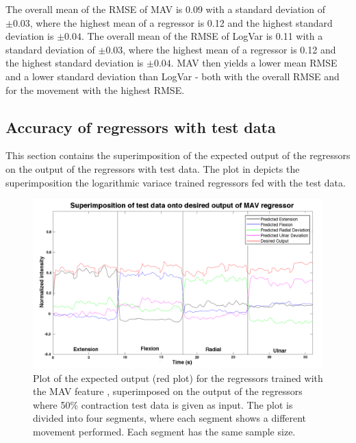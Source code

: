 The overall mean of the RMSE of MAV is 0.09 with a standard deviation of $\pm 0.03$, where the highest mean of a regressor is 0.12 and the highest standard deviation is $\pm 0.04$. The overall mean of the RMSE of LogVar is 0.11 with a standard deviation of $\pm 0.03$, where the highest mean of a regressor is 0.12 and the highest standard deviation is $\pm 0.04$. MAV then yields a lower mean RMSE and a lower standard deviation than LogVar - both with the overall RMSE and for the movement with the highest RMSE.

\subsection{Accuracy of regressors with test data}
This section contains the superimposition of the expected output of the regressors on the output of the regressors with test data. The plot in  depicts the superimposition the logarithmic variace trained regressors fed with the test data.

\begin{figure}[H]
	\includegraphics[width=1\textwidth]{figures/results/NewSuperPoisonMavNewData}  %
	\caption{Plot of the expected output (red plot) for the regressors trained with the MAV feature , superimposed on the output of the regressors where 50\% contraction test data is given as input. The plot is divided into four segments, where each segment shows a different movement performed. Each segment has the same sample size.}
	\label{fig:SuperPoisonMavNewData}  %
\end{figure}

